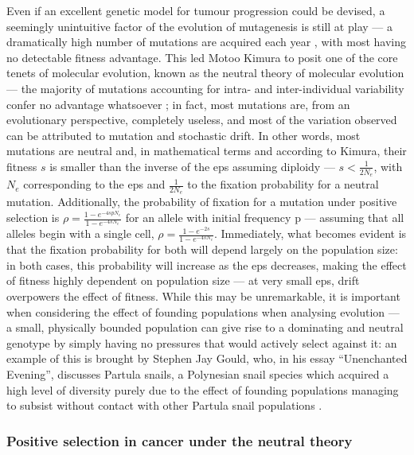Even if an excellent genetic model for tumour progression could be devised, a seemingly unintuitive factor of the evolution of mutagenesis is still at play --- a dramatically high number of mutations are acquired each year \cite{Kimura1968-xd}, with most having no detectable fitness advantage. This led Motoo Kimura to posit one of the core tenets of molecular evolution, known as the neutral theory of molecular evolution --- the majority of mutations accounting for intra- and inter-individual variability confer no advantage whatsoever \cite{Kimura1979-ps}; in fact, most mutations are, from an evolutionary perspective, completely useless, and most of the variation observed can be attributed to mutation and stochastic drift. In other words, most mutations are neutral and, in mathematical terms and according to Kimura, their fitness $s$ is smaller than the inverse of the \ac{eps} assuming diploidy --- $s<\frac{1}{2N_e}$, with $N_e$ corresponding to the \ac{eps} and $\frac{1}{2N_e}$ to the fixation probability for a neutral mutation. Additionally, the probability of fixation for a mutation under positive selection is $\rho = \frac{1-e^{-4spN_e}}{1-e^{-4sN_e}}$ for an allele with initial frequency p \cite{Kimura1962-df} --- assuming that all alleles begin with a single cell, $\rho = \frac{1-e^{-2s}}{1-e^{-4sN_e}}$. Immediately, what becomes evident is that the fixation probability for both will depend largely on the population size: in both cases, this probability will increase as the \ac{eps} decreases, making the effect of fitness highly dependent on population size --- at very small \ac{eps}, drift overpowers the effect of fitness. While this may be unremarkable, it is important when considering the effect of founding populations when analysing evolution --- a small, physically bounded population can give rise to a dominating and neutral genotype by simply having no pressures that would actively select against it: an example of this is brought by Stephen Jay Gould, who, in his essay “Unenchanted Evening”, discusses Partula snails, a Polynesian snail species which acquired a high level of diversity purely due to the effect of founding populations managing to subsist without contact with other Partula snail populations \cite{Gould1995-yr}.

\subsubsection{Positive selection in cancer under the neutral theory}


